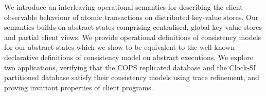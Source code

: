 We introduce an interleaving operational semantics for describing the
client-observable behaviour of atomic transactions on distributed
key-value stores. Our semantics builds on abstract states comprising
centralised, global key-value stores and partial client views. 
We provide operational definitions of consistency models for our abstract states  which
we show to be equivalent to the well-known declarative definitions
of consistency model on abstract executions. 
We explore  two applications, verifying that the COPS replicated database
and the Clock-SI  partitioned database satisfy their 
consistency models using trace refinement,
and proving invariant properties of client programs. 
